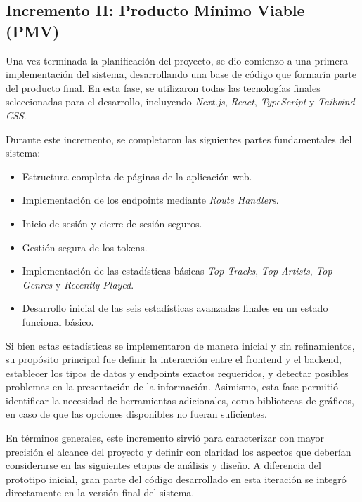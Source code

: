 \subsection*{Incremento II: Producto Mínimo Viable (PMV)}

Una vez terminada la planificación del proyecto, se dio comienzo a una primera implementación del sistema, desarrollando una base de código que formaría parte del producto final. En esta fase, se utilizaron todas las tecnologías finales seleccionadas para el desarrollo, incluyendo \textit{Next.js}, \textit{React}, \textit{TypeScript} y \textit{Tailwind CSS}.

Durante este incremento, se completaron las siguientes partes fundamentales del sistema:

\setlength{\itemsep}{0pt}
\begin{itemize}
    \item Estructura completa de páginas de la aplicación web.
    \item Implementación de los endpoints mediante \textit{Route Handlers}.
    \item Inicio de sesión y cierre de sesión seguros.
    \item Gestión segura de los tokens.
    \item Implementación de las estadísticas básicas \textit{Top Tracks}, \textit{Top Artists}, \textit{Top Genres} y \textit{Recently Played}.
    \item Desarrollo inicial de las seis estadísticas avanzadas finales en un estado funcional básico.
\end{itemize}

Si bien estas estadísticas se implementaron de manera inicial y sin refinamientos, su propósito principal fue definir la interacción entre el frontend y el backend, establecer los tipos de datos y endpoints exactos requeridos, y detectar posibles problemas en la presentación de la información. Asimismo, esta fase permitió identificar la necesidad de herramientas adicionales, como bibliotecas de gráficos, en caso de que las opciones disponibles no fueran suficientes.

En términos generales, este incremento sirvió para caracterizar con mayor precisión el alcance del proyecto y definir con claridad los aspectos que deberían considerarse en las siguientes etapas de análisis y diseño. A diferencia del prototipo inicial, gran parte del código desarrollado en esta iteración se integró directamente en la versión final del sistema.

